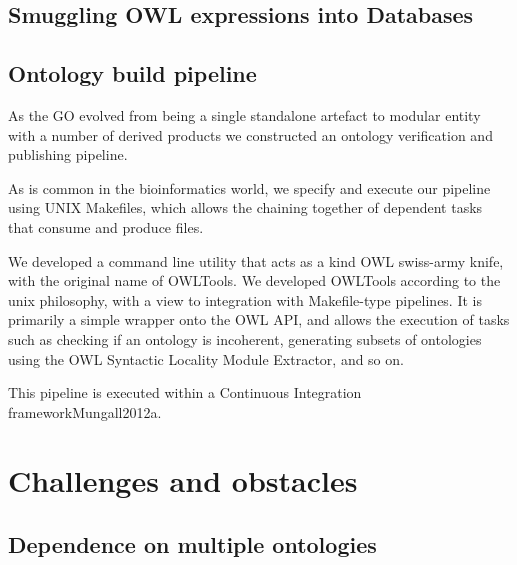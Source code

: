 \documentclass{llncs}
\begin{document}
\subsection{Smuggling OWL expressions into Databases}

\cite{Huntley2014}


\subsection{Ontology build pipeline}

As the GO evolved from being a single standalone artefact to modular
entity with a number of derived products we constructed an ontology
verification and publishing pipeline.

As is common in the bioinformatics world, we specify and execute our
pipeline using UNIX Makefiles, which allows the chaining together of
dependent tasks that consume and produce files.

We developed a command line utility that acts as a kind OWL swiss-army
knife, with the original name of OWLTools\cite{OWLTools}. We developed
OWLTools according to the unix philosophy, with a view to integration
with Makefile-type pipelines. It is primarily a simple wrapper onto
the OWL API, and allows the execution of tasks such as checking if an
ontology is incoherent, generating subsets of ontologies using the OWL
Syntactic Locality Module Extractor, and so on.

This pipeline is executed within a Continuous Integration
framework{Mungall2012a}.

\section{Challenges and obstacles}

\subsection{Dependence on multiple ontologies}


\end{document}
